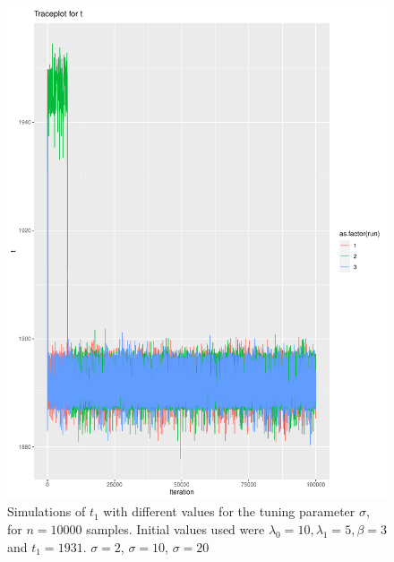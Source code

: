 \begin{figure}[h]
    \centering
    \includegraphics[width = \textwidth]{Images/tuning_t_nice.pdf}
    \caption{Simulations of $t_1$ with different values for the tuning parameter $\sigma$, for $n = 10000$ samples. Initial values used were $\lambda_0 = 10, \lambda_1 = 5, \beta = 3$ and $t_1 = 1931$. $\sigma = 2$,  $\sigma= 10$,  $\sigma= 20$}
    \label{fig:tuning_t_single_2}
\end{figure}

